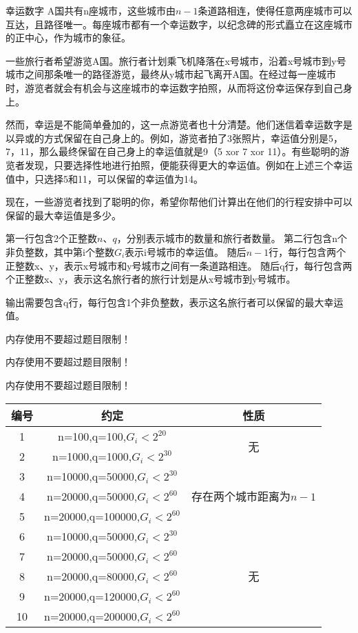\begin{problem}{幸运数字}
A国共有n座城市，这些城市由$n-1$条道路相连，使得任意两座城市可以互达，且路径唯一。每座城市都有一个幸运数字，以纪念碑的形式矗立在这座城市的正中心，作为城市的象征。

一些旅行者希望游览A国。旅行者计划乘飞机降落在x号城市，沿着x号城市到y号城市之间那条唯一的路径游览，最终从y城市起飞离开A国。在经过每一座城市时，游览者就会有机会与这座城市的幸运数字拍照，从而将这份幸运保存到自己身上。

然而，幸运是不能简单叠加的，这一点游览者也十分清楚。他们迷信着幸运数字是以异或的方式保留在自己身上的。例如，游览者拍了3张照片，幸运值分别是5，7，11，那么最终保留在自己身上的幸运值就是9（5 xor 7 xor 11）。有些聪明的游览者发现，只要选择性地进行拍照，便能获得更大的幸运值。例如在上述三个幸运值中，只选择5和11，可以保留的幸运值为14。

现在，一些游览者找到了聪明的你，希望你帮他们计算出在他们的行程安排中可以保留的最大幸运值是多少。

\InputFile
第一行包含2个正整数$n$、$q$，分别表示城市的数量和旅行者数量。
第二行包含n个非负整数，其中第i个整数$G_i$表示i号城市的幸运值。
随后$n-1$行，每行包含两个正整数x、y，表示x号城市和y号城市之间有一条道路相连。
随后q行，每行包含两个正整数x、y，表示这名旅行者的旅行计划是从x号城市到y号城市。

\OutputFile
输出需要包含q行，每行包含1个非负整数，表示这名旅行者可以保留的最大幸运值。

\Example
\begin{example}
\end{example}

\Hint
内存使用不要超过题目限制！

内存使用不要超过题目限制！

内存使用不要超过题目限制！

\Note
\begin{center}
\begin{tabular}{c|c|c}
\hline
\textsf{编号}&\textsf{约定}&\textsf{性质}\\
\hline
1	&n=100,q=100,$G_i<2^{20}$&\multirow{2}{*}{无}\\
\cline{1-2}
2	&n=1000,q=1000,$G_i<2^{30}$\\
\hline
3	&n=10000,q=50000,$G_i<2^{30}$&\multirow{3}{*}{存在两个城市距离为$n-1$}\\
\cline{1-2}
4	&n=20000,q=50000,$G_i<2^{60}$\\
\cline{1-2}
5	&n=20000,q=100000,$G_i<2^{60}$\\
\hline
6	&n=10000,q=50000,$G_i<2^{30}$&\multirow{5}{*}{无}\\
\cline{1-2}
7	&n=20000,q=50000,$G_i<2^{60}$\\
\cline{1-2}
8	&n=20000,q=80000,$G_i<2^{60}$\\
\cline{1-2}
9	&n=20000,q=120000,$G_i<2^{60}$\\
\cline{1-2}
10	&n=20000,q=200000,$G_i<2^{60}$\\
\hline
\end{tabular}
\end{center}
\end{problem}
